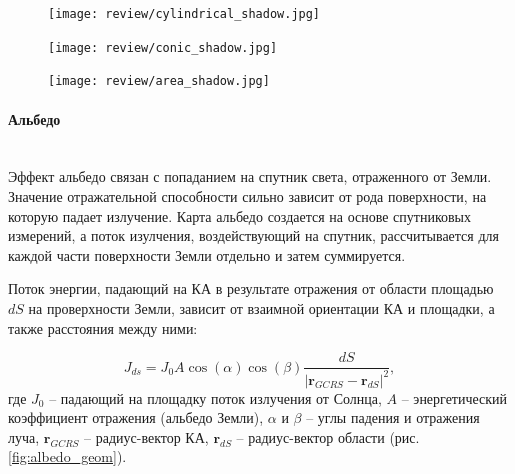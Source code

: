 \begin{figure}[ht]
  \begin{minipage}[c]{0.68\textwidth}
    \centering
    \texttt{[image: review/cylindrical\_shadow.jpg]}
    \label{fig:cylindrical_shadow}
    
    \vspace{0.5cm} %
    
    \texttt{[image: review/conic\_shadow.jpg]}
    \label{fig:conic_shadow}
  \end{minipage}
  \hfill
  \begin{minipage}[c]{0.3\textwidth}
    \centering
    \texttt{[image: review/area\_shadow.jpg]}
    \label{fig:area_shadow}
  \end{minipage}

  \label{fig:combined}
\end{figure}

\paragraph{Альбедо} \mbox{} \\

Эффект альбедо связан с попаданием на спутник света, отраженного от Земли.
Значение отражательной способности сильно зависит от рода поверхности, на которую падает излучение.
Карта альбедо создается на основе спутниковых измерений, а поток изулчения,
воздействующий на спутник, рассчитывается для каждой части поверхности Земли отдельно и затем суммируется.

Поток энергии, падающий на КА в результате отражения от области площадью $dS$ на 
проверхности Земли, зависит от взаимной
ориентации КА и площадки, а также расстояния между ними:

\begin{equation*}
    J_{ds} = J_0 A \cos(\alpha) \cos (\beta) 
    \frac{dS}{|\mathbf{r}_{GCRS} - \mathbf{r}_{dS}|^2},
\end{equation*}
где $J_0$ -- падающий на площадку поток излучения от Солнца, 
$A$ -- энергетический коэффициент отражения (альбедо Земли),
$\alpha$ и $\beta$ -- углы падения и отражения луча, 
$\mathbf{r}_{GCRS}$ -- радиус-вектор КА,
$\mathbf{r}_{dS}$ -- радиус-вектор области (рис. \ref{fig:albedo_geom}).

